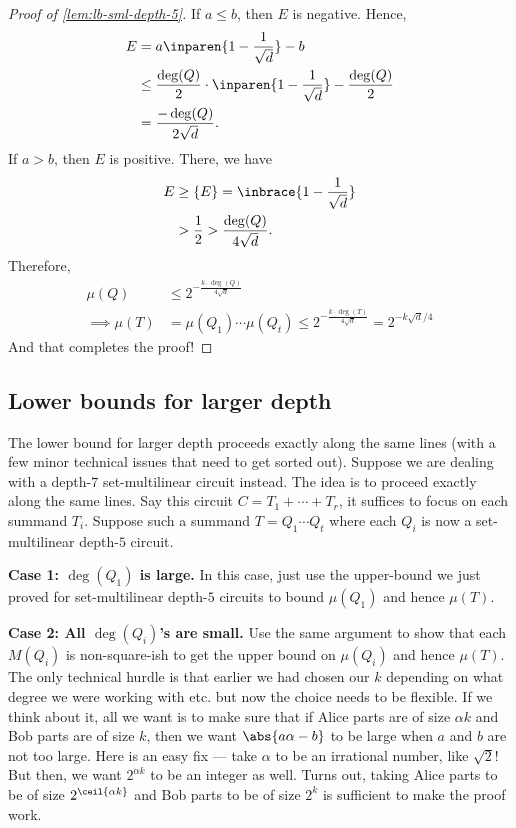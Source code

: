 \begin{proof}[Proof of \autoref{lem:lb-sml-depth-5}]
  \noindent
  If $a \leq b$, then $E$ is negative. Hence,
  \begin{align*}
    E & =  a\inparen{1 - \frac{1}{\sqrt{d}}} - b\\
      & \leq \frac{\deg(Q)}{2} \cdot \inparen{1 - \frac{1}{\sqrt{d}}} - \frac{\deg(Q)}{2}\\
      & = \frac{-\deg(Q)}{2\sqrt{d}}.
  \end{align*}
  If $a > b$, then $E$ is positive. There, we have
  \begin{align*}
    E & \geq \{E\} = \inbrace{1 - \frac{1}{\sqrt{d}}}\\
      & > \frac{1}{2} > \frac{\deg(Q)}{4\sqrt{d}}.
  \end{align*}
  Therefore,
  \begin{align*}
    \mu(Q) & \leq 2^{- \frac{k \cdot \deg(Q)}{4\sqrt{d}}}\\
    \implies \mu(T) & = \mu(Q_1)\cdots \mu(Q_t) \leq 2^{-\frac{k \cdot \deg(T)}{4\sqrt{d}}} = 2^{-k\sqrt{d}/4}
  \end{align*}
  And that completes the proof!  
\end{proof}


\subsection{Lower bounds for larger depth}

The lower bound for larger depth proceeds exactly along the same lines (with a few minor technical issues that need to get sorted out). Suppose we are dealing with a depth-$7$ set-multilinear circuit instead. The idea is to proceed exactly along the same lines. Say this circuit $C = T_1 + \cdots + T_r$, it suffices to focus on each summand $T_i$. Suppose such a summand $T = Q_1 \cdots Q_t$ where each $Q_i$ is now a set-multilinear depth-$5$ circuit.

{\bf Case 1: $\deg(Q_1)$ is large.} In this case, just use the upper-bound we just proved for set-multilinear depth-$5$ circuits to bound $\mu(Q_1)$ and hence $\mu(T)$.

\medskip

{\bf Case 2: All $\deg(Q_i)$'s are small.} Use the same argument to show that each $M(Q_i)$ is non-square-ish to get the upper bound on $\mu(Q_i)$ and hence $\mu(T)$.\\

The only technical hurdle is that earlier we had chosen our $k$ depending on what degree we were working with etc. but now the choice needs to be flexible. If we think about it, all we want is to make sure that if Alice parts are of size $\alpha k$ and Bob parts are of size $k$, then we want $\abs{a\alpha - b}$ to be large when $a$ and $b$ are not too large. Here is an easy fix --- take $\alpha$ to be an irrational number, like $\sqrt{2}$! But then, we want $2^{\alpha k}$ to be an integer as well. Turns out, taking Alice parts to be of size $2^{\ceil{\alpha k}}$ and Bob parts to be of size $2^{k}$ is sufficient to make the proof work. 

